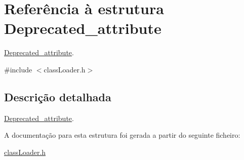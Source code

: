 \hypertarget{struct_deprecated__attribute}{}\section{Referência à estrutura Deprecated\+\_\+attribute}
\label{struct_deprecated__attribute}


\hyperlink{struct_deprecated__attribute}{Deprecated\+\_\+attribute}.  




{\ttfamily \#include $<$class\+Loader.\+h$>$}



\subsection{Descrição detalhada}
\hyperlink{struct_deprecated__attribute}{Deprecated\+\_\+attribute}. 

A documentação para esta estrutura foi gerada a partir do seguinte ficheiro\+:\begin{DoxyCompactItemize}
\item 
\hyperlink{class_loader_8h}{class\+Loader.\+h}\end{DoxyCompactItemize}
